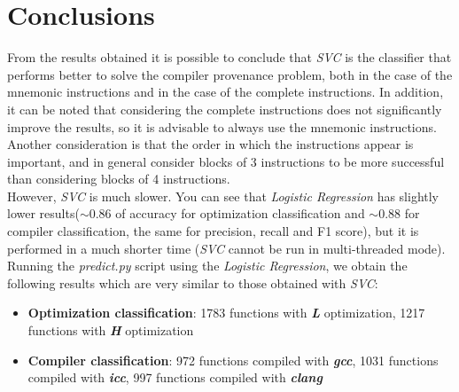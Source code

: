 \documentclass[11pt]{article}
\begin{document}
\section{Conclusions}
From the results obtained it is possible to conclude that \textit{SVC} is the classifier that performs better to solve the compiler provenance problem, both in the case of the mnemonic instructions and in the case of the complete instructions. In addition, it can be noted that considering the complete instructions does not significantly improve the results, so it is advisable to always use the mnemonic instructions. Another consideration is that the order in which the instructions appear is important, and in general consider blocks of 3 instructions to be more successful than considering blocks of 4 instructions. \\
However, \textit{SVC} is much slower. You can see that \textit{Logistic Regression} has slightly lower results($\sim$0.86 of accuracy  for optimization classification and $\sim$0.88 for compiler classification, the same for precision, recall and F1 score), but it is performed in a much shorter time (\textit{SVC} cannot be run in multi-threaded mode). Running the \textit{predict.py} script using the \textit{Logistic Regression}, we obtain the following results which are very similar to those obtained with \textit{SVC}:
\begin{itemize}
	\item \textbf{Optimization classification}: 1783 functions with \textbf{\textit{L}} optimization, 1217 functions with \textbf{\textit{H}} optimization
	\item \textbf{Compiler classification}: 972 functions compiled with \textbf{\textit{gcc}}, 1031 functions compiled with \textbf{\textit{icc}}, 997 functions compiled with \textbf{\textit{clang}}
\end{itemize}
\end{document}
